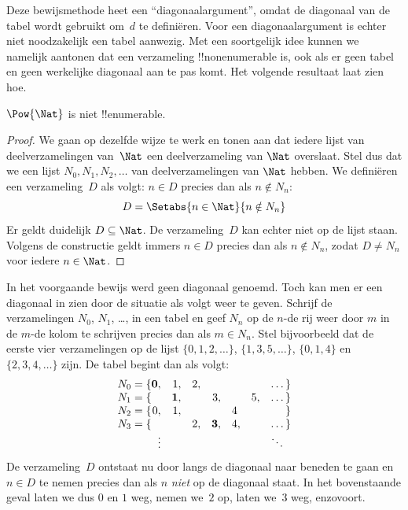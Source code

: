 \documentclass[openany]{memoir}
\begin{document}
\begin{explain}
Deze bewijsmethode heet een ``diagonaalargument'', omdat de diagonaal van
de tabel wordt gebruikt om~$d$ te definiëren. Voor een diagonaalargument
is echter niet noodzakelijk een tabel aanwezig. Met een soortgelijk idee
kunnen we namelijk aantonen dat een verzameling !!{nonenumerable} is,
ook als er geen tabel en geen werkelijke diagonaal aan te pas komt. Het
volgende resultaat laat zien hoe.
\end{explain}

\begin{thm}
$\Pow{\Nat}$ is niet !!{enumerable}.
\end{thm}

\begin{proof}
We gaan op dezelfde wijze te werk en tonen aan dat iedere lijst van
deelverzamelingen van~$\Nat$ een deelverzameling van $\Nat$ overslaat.
Stel dus dat we een lijst $N_0, N_1, N_2, \ldots$ van
deelverzamelingen van $\Nat$ hebben. We definiëren een verzameling~$D$
als volgt: $n \in D$ precies dan als $n \notin N_{n}$:
\[
D = \Setabs{n \in \Nat}{n \notin N_n}
\]
Er geldt duidelijk $D\subseteq \Nat$. De verzameling~$D$ kan echter
niet op de lijst staan. Volgens de constructie geldt immers $n \in D$
precies dan als $n\notin N_n$, zodat $D \neq N_n$ voor iedere
$n \in \Nat$.
\end{proof}

\begin{explain}
In het voorgaande bewijs werd geen diagonaal genoemd. Toch kan men er
een diagonaal in zien door de situatie als volgt weer te geven. Schrijf
de verzamelingen $N_0$, $N_1$, \dots, in een tabel en geef $N_n$ op de
$n$-de rij weer door $m$ in de $m$-de kolom te schrijven precies dan
als $m \in N_n$. Stel bijvoorbeeld dat de eerste vier verzamelingen op
de lijst $\{0,1,2,\dots\}$, $\{1, 3, 5, \dots\}$, $\{0,1,4\}$ en
$\{2,3,4,\dots\}$ zijn. De tabel begint dan als volgt:
\[
\begin{array}{r@{}rrrrrrr}
  N_0 = \{ & \mathbf{0}, & 1, & 2, & & & & \dots\}\\
  N_1 = \{ &  & \mathbf{1}, &  & 3, &  & 5, & \dots\}\\
  N_2 = \{ & 0, & 1, &  &  & 4\phantom{,} &  & \}\\
  N_3 = \{ &  &  & 2, & \mathbf{3}, & 4, & & \dots\}\\
  &\vdots & & & & & & \ddots\phantom{\}}
  \end{array}
\]
De verzameling~$D$ ontstaat nu door langs de diagonaal naar beneden te
gaan en $n \in D$ te nemen precies dan als $n$ \emph{niet} op de
diagonaal staat. In het bovenstaande geval laten we dus $0$ en $1$
weg, nemen we~$2$ op, laten we~$3$ weg, enzovoort.
\end{explain}
\end{document}
